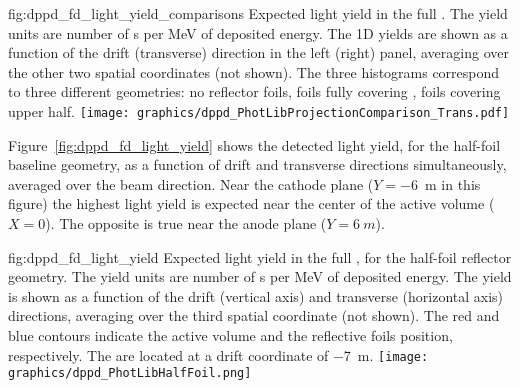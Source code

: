 \begin{dunefigure}{fig:dppd_fd_light_yield_comparisons}
{Expected light yield in the full . The yield units are number of \phel{}s per \si{\MeV} of deposited energy. The 1D yields are shown as a function of the drift (transverse) direction in the left (right) panel, averaging over the other two spatial coordinates (not shown). The three histograms correspond to three different geometries: no  reflector foils, foils fully covering , foils covering upper  half.}
 \hfill
\texttt{[image: graphics/dppd\_PhotLibProjectionComparison\_Trans.pdf]}
\end{dunefigure}
 

Figure~\ref{fig:dppd_fd_light_yield} shows the detected light yield, for the half-foil baseline geometry, as a function of drift and transverse directions simultaneously, averaged over the beam direction. Near the cathode plane ($Y=$\SI{-6}{m} in this figure) the highest light yield is expected near the center of the active volume ($X=0$). The opposite is true near the anode plane ($Y=\SI{+6}{m}$).  

\begin{dunefigure}{fig:dppd_fd_light_yield}
{Expected light yield in the full , for the half-foil  reflector  geometry. The yield units are number of \phel{}s per \si{\MeV} of deposited energy. The \twod yield is shown as a function of the drift (vertical axis) and transverse (horizontal axis) directions, averaging over the third spatial coordinate (not shown). The red and blue contours indicate the  active volume and the reflective foils position, respectively. The  are located at a drift coordinate of \SI{-7}{\m}.}
\texttt{[image: graphics/dppd\_PhotLibHalfFoil.png]} 
\end{dunefigure}
